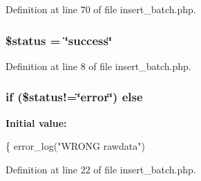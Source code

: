 Definition at line 70 of file insert\-\_\-batch.\-php.

\hypertarget{insert__batch_8php_a58391ea75f2d29d5d708d7050b641c33}{
\subsubsection[{\$status}]{\setlength{\rightskip}{0pt plus 5cm}\$status = \char`\"{}success\char`\"{}}}\label{insert__batch_8php_a58391ea75f2d29d5d708d7050b641c33}


Definition at line 8 of file insert\-\_\-batch.\-php.

\hypertarget{insert__batch_8php_a753a9e142fa9d5ae330b048b41897a07}{
\subsubsection[{else}]{\setlength{\rightskip}{0pt plus 5cm}if (\$status!=\char`\"{}error\char`\"{}) else}}\label{insert__batch_8php_a753a9e142fa9d5ae330b048b41897a07}
{\bfseries Initial value\-:}
\begin{DoxyCode}
\{
        error\_log(\textcolor{stringliteral}{"WRONG rawdata"})
\end{DoxyCode}


Definition at line 22 of file insert\-\_\-batch.\-php.

